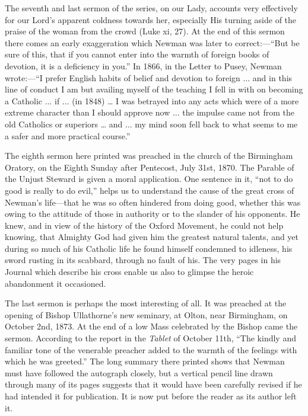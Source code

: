 The seventh and last sermon of the series, on our
Lady, accounts very effectively for our Lord's apparent coldness
towards her, especially His turning aside of the praise of the woman
from the crowd (Luke xi, 27). At the end of this sermon there comes an
early exaggeration which Newman was later to correct:—``But be
sure of this, that if you cannot enter into the warmth of foreign books of devotion, it is a deficiency in you.'' In 1866, in the Letter
to Pusey, Newman wrote:—``I prefer English habits of belief and
devotion to foreign ... and in this line of conduct I am but availing
myself of the teaching I fell in with on becoming a Catholic ... if
... (in 1848) … I was betrayed into any acts which were of a more
extreme character than I should approve now ... the impulse came not
from the old Catholics or superiors … and ... my mind soon fell back
to what seems to me a safer and more practical course.'' 


The eighth sermon here printed was preached in
the church of the Birmingham Oratory, on the Eighth Sunday after
Pentecost, July 31st, 1870. The Parable of the Unjust Steward is given
a moral application. One sentence in it, ``not to do good is
really to do evil,'' helps us to understand the cause of the great
cross of Newman's life—that he was so often hindered from doing
good, whether this was owing to the attitude of those in authority or
to the slander of his opponents. He knew, and in view of the history
of the Oxford Movement, he could not help knowing, that Almighty God
had given him the greatest natural talents, and yet during so much of
his Catholic life he found himself condemned to idleness, his sword
rusting in its scabbard, through no fault of his. The very pages in
his Journal which describe his cross enable us also to glimpse
the heroic abandonment it occasioned.


The last sermon is perhaps the most interesting
of all. It was preached at the opening of Bishop Ullathorne's new
seminary, at Olton, near Birmingham, on October 2nd, 1873. At the end
of a low Mass celebrated by the Bishop came the sermon. According to
the report in the \emph{Tablet} of October 11th, ``The kindly and
familiar tone of the venerable preacher added to the warmth of the
feelings with which he was greeted.'' The long summary there printed
shows that Newman must have followed the autograph closely, but a
vertical pencil line drawn through many of its pages suggests that it
would have been carefully revised if he had intended it for
publication. It is now put before the reader as its author left it.



